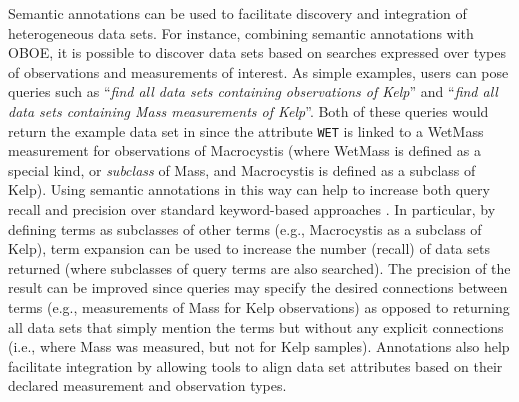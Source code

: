 Semantic annotations can be used to facilitate discovery and
integration of heterogeneous data sets. For instance, combining
semantic annotations with OBOE, it is possible to discover data sets
based on searches expressed over types of observations and
measurements of interest. As simple examples, users can pose queries
such as ``\emph{find all data sets containing observations of Kelp}''
and ``\emph{find all data sets containing Mass measurements of
  Kelp}''.  Both of these queries would return the example data set in
 since the attribute {\tt WET} is linked
to a WetMass measurement for observations of Macrocystis (where
WetMass is defined as a special kind, or \emph{subclass} of Mass, and
Macrocystis is defined as a subclass of Kelp). Using semantic
annotations in this way can help to increase both query recall and
precision over standard keyword-based approaches
\cite{berkley09:_improv_data_discov_for_metad}. In particular, by
defining terms as subclasses of other terms (e.g., Macrocystis as a
subclass of Kelp), term expansion can be used to increase the number
(recall) of data sets returned (where subclasses of query terms are
also searched). The precision of the result can be improved since
queries may specify the desired connections between terms (e.g.,
measurements of Mass for Kelp observations) as opposed to returning
all data sets that simply mention the terms but without any explicit
connections (i.e., where Mass was measured, but not for Kelp samples).
Annotations also help facilitate integration by allowing
tools to align data set attributes based on their declared measurement
and observation types.


